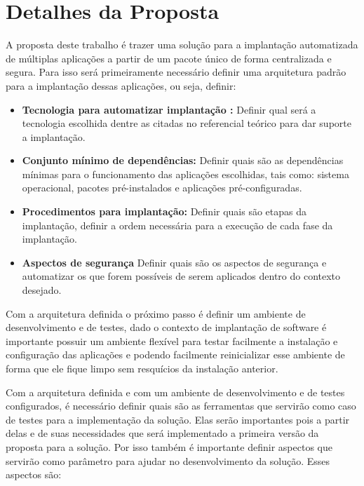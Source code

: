 \section{Detalhes da Proposta}

A proposta deste trabalho é trazer uma solução para a implantação automatizada
de múltiplas aplicações a partir de um pacote único de forma centralizada e segura.
Para isso será primeiramente necessário definir uma arquitetura padrão para a
implantação dessas aplicações, ou seja, definir:

\begin{itemize}
  \item  \textbf{Tecnologia para automatizar implantação :}  Definir qual será a
  tecnologia escolhida dentre as citadas no referencial teórico para dar suporte
  a implantação.
  \item  \textbf{Conjunto mínimo de dependências:} Definir quais são as dependências
  mínimas para o funcionamento das aplicações escolhidas, tais como: sistema operacional,
  pacotes pré-instalados e aplicações pré-configuradas.
  \item  \textbf{Procedimentos para implantação:} Definir quais são etapas da implantação,
  definir a ordem necessária para a execução de cada fase da implantação.
  \item  \textbf{Aspectos de segurança} Definir quais são os aspectos de segurança
  e automatizar os que forem possíveis de serem aplicados dentro do contexto desejado.
\end{itemize}

Com a arquitetura definida o próximo passo é definir um ambiente de desenvolvimento e de
testes, dado o contexto de implantação de software é importante possuir um ambiente flexível para
testar facilmente a instalação e configuração das aplicações e podendo facilmente
reinicializar esse ambiente de forma que ele fique limpo sem resquícios da instalação
anterior.

Com a arquitetura definida e com um ambiente de desenvolvimento e de testes configurados, é
necessário definir quais são as ferramentas que servirão como caso de testes
para a implementação da solução. Elas serão importantes pois a partir delas
e de suas necessidades que será implementado a primeira versão da proposta para
a solução. Por isso também é importante definir aspectos que servirão como parâmetro
para ajudar no desenvolvimento da solução. Esses aspectos são:

